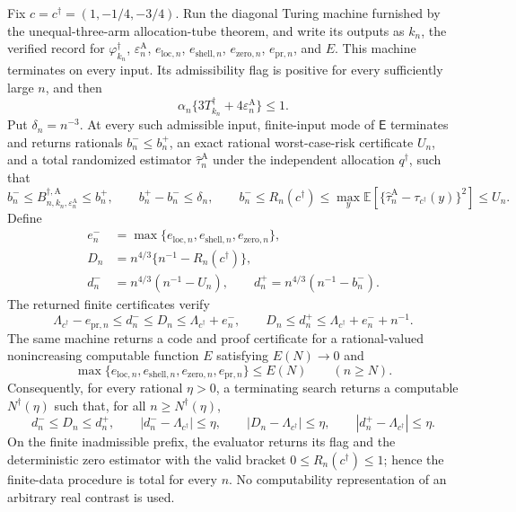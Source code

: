 Fix \(c=c^\dagger=(1,-1/4,-3/4)\).  Run the diagonal Turing machine furnished by the unequal-three-arm allocation-tube theorem, and write its outputs as
\(k_n\), the verified record for \(\varphi_{k_n}^\dagger\),
\(\varepsilon_n^{\mathrm A}\), \(e_{\mathrm{loc},n}\),
\(e_{\mathrm{shell},n}\), \(e_{\mathrm{zero},n}\),
\(e_{\mathrm{pr},n}\), and \(E\).  This machine terminates on every input.  Its admissibility flag is positive for every sufficiently large \(n\), and then
\[
\alpha_n\{3T_{k_n}^\dagger+4\varepsilon_n^{\mathrm A}\}\le1.
\]
Put \(\delta_n=n^{-3}\).  At every such admissible input, finite-input mode of
\(\mathsf E\) terminates and returns rationals \(b_n^-\le b_n^+\), an exact rational worst-case-risk certificate \(U_n\), and a total randomized estimator
\(\widehat\tau_n^{\mathrm A}\) under the independent allocation \(q^\dagger\), such that
\[
b_n^-\le B_{n,k_n,\varepsilon_n^{\mathrm A}}^{\dagger,\mathrm A}
\le b_n^+,
\qquad b_n^+-b_n^-\le\delta_n,
\qquad
b_n^-\le R_n(c^\dagger)\le
\max_y\mathbb E\!\left[
\{\widehat\tau_n^{\mathrm A}-\tau_{c^\dagger}(y)\}^2
\right]\le U_n.
\]
Define
\[
\begin{aligned}
e_n^-&=\max\{e_{\mathrm{loc},n},e_{\mathrm{shell},n},
e_{\mathrm{zero},n}\},\\
D_n&=n^{4/3}\{n^{-1}-R_n(c^\dagger)\},\\
d_n^-&=n^{4/3}(n^{-1}-U_n),
\qquad d_n^+=n^{4/3}(n^{-1}-b_n^-).
\end{aligned}
\]
The returned finite certificates verify
\[
\Lambda_{c^\dagger}-e_{\mathrm{pr},n}
\le d_n^-\le D_n\le\Lambda_{c^\dagger}+e_n^-,
\qquad
D_n\le d_n^+\le\Lambda_{c^\dagger}+e_n^-+n^{-1}.
\]
The same machine returns a code and proof certificate for a rational-valued nonincreasing computable function \(E\) satisfying \(E(N)\to0\) and
\[
\max\{e_{\mathrm{loc},n},e_{\mathrm{shell},n},
e_{\mathrm{zero},n},e_{\mathrm{pr},n}\}\le E(N)
\qquad(n\ge N).
\]
Consequently, for every rational \(\eta>0\), a terminating search returns a computable
\(N^\dagger(\eta)\) such that, for all \(n\ge N^\dagger(\eta)\),
\[
d_n^-\le D_n\le d_n^+,
\qquad
|d_n^--\Lambda_{c^\dagger}|\le\eta,
\qquad
|D_n-\Lambda_{c^\dagger}|\le\eta,
\qquad
|d_n^+-\Lambda_{c^\dagger}|\le\eta.
\]
On the finite inadmissible prefix, the evaluator returns its flag and the deterministic zero estimator with the valid bracket
\(0\le R_n(c^\dagger)\le1\); hence the finite-data procedure is total for every \(n\).  No computability representation of an arbitrary real contrast is used.
